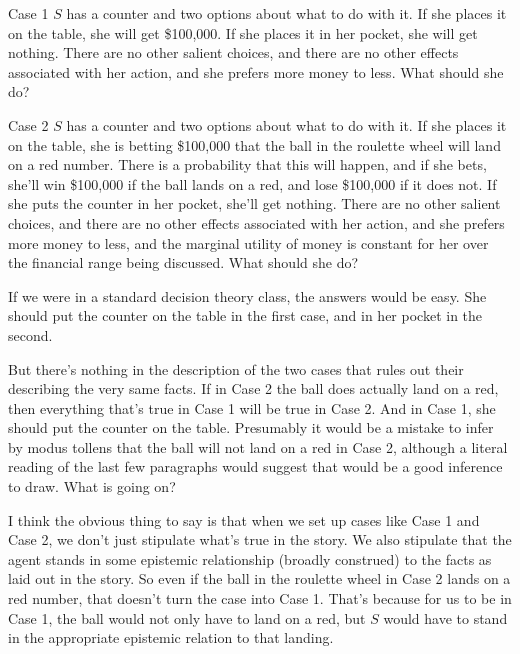 {\begin{description*}
\item[Case 1] \(S\) has a counter and two options about what to do with it. If she places it on the table, she will get \$100,000. If she places it in her pocket, she will get nothing. There are no other salient choices, and there are no other effects associated with her action, and she prefers more money to less. What should she do?
\item[Case 2] \(S\) has a counter and two options about what to do with it. If she places it on the table, she is betting \$100,000 that the ball in the roulette wheel will land on a red number. There is a  probability that this will happen, and if she bets, she'll win \$100,000 if the ball lands on a red, and lose \$100,000 if it does not. If she puts the counter in her pocket, she'll get nothing. There are no other salient choices, and there are no other effects associated with her action, and she prefers more money to less, and the marginal utility of money is constant for her over the financial range being discussed. What should she do?
\end{description*}

\noindent If we were in a standard decision theory class, the answers would be easy. She should put the counter on the table in the first case, and in her pocket in the second. 

But there's nothing in the description of the two cases that rules out their describing the very same facts. If in Case 2 the ball does actually land on a red, then everything that's true in Case 1 will be true in Case 2. And in Case 1, she should put the counter on the table. Presumably it would be a mistake to infer by modus tollens that the ball will not land on a red in Case 2, although a literal reading of the last few paragraphs would suggest that would be a good inference to draw. What is going on?

I think the obvious thing to say is that when we set up cases like Case 1 and Case 2, we don't just stipulate what's true in the story. We also stipulate that the agent stands in some epistemic relationship (broadly construed) to the facts as laid out in the story. So even if the ball in the roulette wheel in Case 2 lands on a red number, that doesn't turn the case into Case 1. That's because for us to be in Case 1, the ball would not only have to land on a red, but \(S\) would have to stand in the appropriate epistemic relation to that landing.

}
